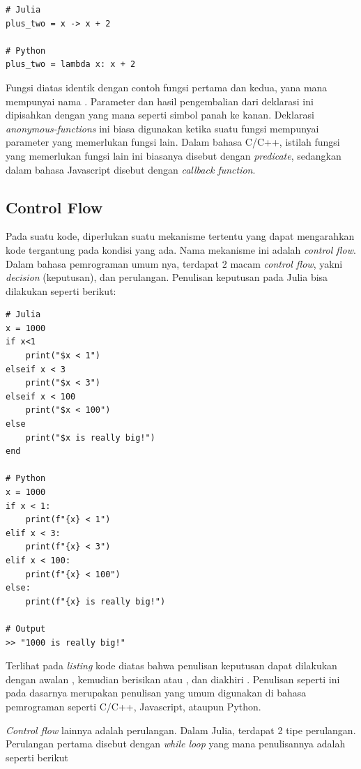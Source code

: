 \begin{lstlisting}
# Julia
plus_two = x -> x + 2

# Python
plus_two = lambda x: x + 2
\end{lstlisting}

\noindent
Fungsi diatas identik dengan contoh fungsi pertama dan kedua, yana mana
mempunyai nama . Parameter dan hasil pengembalian dari deklarasi
ini dipisahkan dengan \cw{->} yang mana seperti simbol panah ke kanan. Deklarasi
\emph{anonymous-functions} ini biasa digunakan ketika suatu fungsi mempunyai parameter
yang memerlukan fungsi lain. Dalam bahasa C/C++, istilah fungsi yang memerlukan fungsi
lain ini biasanya disebut dengan \emph{predicate}, sedangkan dalam bahasa Javascript
disebut dengan \emph{callback function}.

\subsection{Control Flow}

Pada suatu kode, diperlukan suatu mekanisme tertentu yang dapat mengarahkan
kode tergantung pada kondisi yang ada. Nama mekanisme ini adalah \emph{control
	flow}. Dalam bahasa pemrograman umum nya, terdapat 2 macam \emph{control flow},
yakni \emph{decision} (keputusan), dan perulangan. Penulisan keputusan pada
Julia bisa dilakukan seperti berikut:

\begin{lstlisting}
# Julia
x = 1000
if x<1
    print("$x < 1")
elseif x < 3
    print("$x < 3")
elseif x < 100
    print("$x < 100")
else
    print("$x is really big!")
end

# Python
x = 1000
if x < 1:
    print(f"{x} < 1")
elif x < 3:
    print(f"{x} < 3")
elif x < 100:
    print(f"{x} < 100")
else:
    print(f"{x} is really big!")

# Output
>> "1000 is really big!"
\end{lstlisting}

\noindent
Terlihat pada \emph{listing} kode diatas bahwa penulisan keputusan dapat
dilakukan dengan awalan , kemudian berisikan  atau , dan
diakhiri . Penulisan seperti ini pada dasarnya merupakan penulisan yang umum
digunakan di bahasa pemrograman seperti C/C++, Javascript, ataupun Python.

\emph{Control flow} lainnya adalah perulangan. Dalam Julia, terdapat 2 tipe
perulangan. Perulangan pertama disebut dengan \emph{while loop} yang mana
penulisannya adalah seperti berikut

